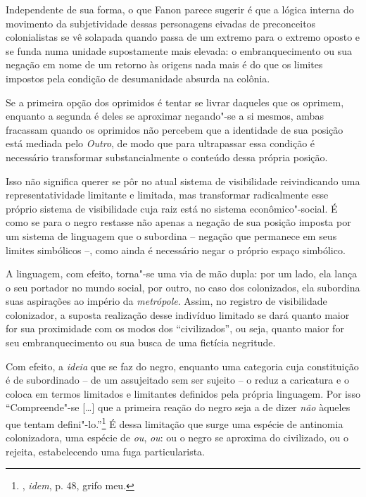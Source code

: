 Independente de sua forma, o que Fanon parece sugerir é que a lógica
interna do movimento da subjetividade dessas personagens eivadas de
preconceitos colonialistas se vê solapada quando passa de um extremo
para o extremo oposto e se funda numa unidade supostamente mais elevada:
o embranquecimento ou sua negação em nome de um retorno às origens nada
mais é do que os limites impostos pela condição de desumanidade absurda
na colônia.

Se a primeira opção dos oprimidos é tentar se livrar daqueles que os
oprimem, enquanto a segunda é deles se aproximar negando"-se a si mesmos,
ambas fracassam quando os oprimidos não percebem que a identidade de sua
posição está mediada pelo \emph{Outro}, de modo que para ultrapassar
essa condição é necessário transformar substancialmente o conteúdo dessa
própria posição.

Isso não significa querer se pôr no atual sistema de visibilidade
reivindicando uma representatividade limitante e limitada, mas
transformar radicalmente esse próprio sistema de visibilidade cuja raiz
está no sistema econômico"-social. É como se para o negro restasse não
apenas a negação de sua posição imposta por um sistema de linguagem que
o subordina -- negação que permanece em seus limites simbólicos --, como
ainda é necessário negar o próprio espaço simbólico.

A linguagem, com efeito, torna"-se uma via de mão dupla: por um lado, ela
lança o seu portador no mundo social, por outro, no caso dos
colonizados, ela subordina suas aspirações ao império da
\emph{metrópole}. Assim, no registro de visibilidade colonizador, a
suposta realização desse indivíduo limitado se dará quanto maior for sua
proximidade com os modos dos ``civilizados'', ou seja, quanto maior for
seu embranquecimento ou sua busca de uma fictícia negritude.

Com efeito, a \emph{ideia} que se faz do negro, enquanto uma categoria
cuja constituição é de subordinado -- de um assujeitado sem ser sujeito --
o reduz a caricatura e o coloca em termos limitados e limitantes
definidos pela própria linguagem. Por isso ``Compreende"-se {[}\ldots{}{]} que
a primeira reação do negro seja a de dizer \emph{não} àqueles que tentam
defini"-lo.''\footnote{, \emph{idem}, p. 48, grifo meu.} É dessa limitação
que surge uma espécie de antinomia colonizadora, uma espécie de
\emph{ou}, \emph{ou}: ou o negro se aproxima do civilizado, ou o
rejeita, estabelecendo uma fuga particularista.

